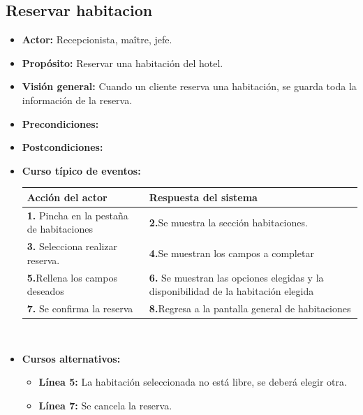 \documentclass[spanish,a4paper,11pt, twoside]{report}	%
\begin{document}
	\subsection{Reservar habitacion}
		\begin{itemize}
			\item \textbf{Actor:} Recepcionista, maître, jefe.
			\item \textbf{Propósito: } Reservar una habitación del hotel.
			\item \textbf{Visión general:} Cuando un cliente reserva una habitación, se guarda toda la información de la reserva.
			\item \textbf{Precondiciones:} 
			\item \textbf{Postcondiciones:} 
			\item \textbf{Curso típico de eventos:} 	\\
				\begin{tabular}{|p{6cm}||p{6cm}|}
				\hline
				\textbf{Acción del actor} & \textbf{Respuesta del sistema} \\ \hline
				\textbf{1.} Pincha en la pestaña de habitaciones & \textbf{2.}Se muestra la sección habitaciones.\\ \hline 
				\textbf{3.} Selecciona realizar reserva. & \textbf{4.}Se muestran los campos a completar  \\ \hline
				\textbf{5.}Rellena los campos deseados & \textbf{6.} Se muestran las opciones elegidas y la disponibilidad de la habitación elegida \\ \hline
				\textbf{7.} Se confirma la reserva & \textbf{8.}Regresa a la pantalla general de habitaciones\\ \hline
			\end{tabular}
			\\
			\item \textbf{Cursos alternativos:} 
			\begin{itemize}
			\item  \textbf{Línea 5:} La habitación seleccionada no está libre, se deberá elegir otra.
			\item  \textbf{Línea 7:} Se cancela la reserva. \\
			\end {itemize}
		\end {itemize}

\end{document}
